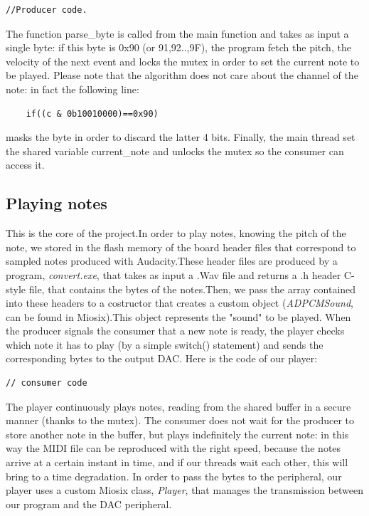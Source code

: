 \documentclass[12pt]{article}
\begin{document}
\begin{lstlisting}
//Producer code.
\end{lstlisting}

The function parse\_byte is called from the main function and takes as input a single byte: if this byte is 0x90 (or 91,92..,9F), the program fetch the pitch, the velocity of the next event and locks the mutex in order to set the current note to be played. Please note that the algorithm does not care about the channel of the note: in fact the following line:
\begin{lstlisting}
	if((c & 0b10010000)==0x90)
\end{lstlisting}
masks the byte in order to discard the latter 4 bits.\newline
Finally, the main thread set the shared variable current\_note and unlocks the mutex so the consumer can access it.

\subsection{Playing notes}
This is the core of the project.In order to play notes, knowing the pitch of the note, we stored in the flash memory of the board header files that correspond to sampled notes produced with Audacity.These header files are produced by a program, \textit{convert.exe}, that takes as input a .Wav file and returns a .h header C-style file, that contains the bytes of the notes.Then, we pass the array contained into these headers to a costructor that creates a custom object (\textit{ADPCMSound}, can be found in Miosix).This object represents the "sound" to be played.\newline
 When the producer signals the consumer that a new note is ready, the player checks which note it has to play (by a simple switch() statement) and sends the corresponding bytes to the output DAC. Here is the code of our player:

\begin{lstlisting}
// consumer code
\end{lstlisting}
The player continuously plays notes, reading from the shared buffer in a secure manner (thanks to the mutex). The consumer does not wait for the producer to store another note in the buffer, but plays indefinitely the current note: in this way the MIDI file can be reproduced with the right speed, because the notes arrive at a certain instant in time, and if our threads wait each other, this will bring to a time degradation.\newline
In order to pass the bytes to the peripheral, our player uses a custom Miosix class, \textit{Player}, that manages the transmission between our program and the DAC peripheral.
\end{document}
